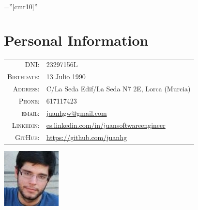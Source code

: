 \documentclass[a4paper,10pt]{article} %
\begin{document}
\pagestyle{empty} %

\font\fb=''[cmr10]'' %


\par{\bigskip\par} %

\section{Personal Information}

\noindent\begin{minipage}{0.3\textwidth}%
\begin{tabular}{rl}
\textsc{DNI:} & 23297156L \\
\textsc{Birthdate:} & 13 Julio 1990 \\
\textsc{Address:} & C/La Seda Edif/La Seda N7 2E, Lorca (Murcia) \\
\textsc{Phone:} & 617117423\\
\textsc{email:} & \href{mailto:juanhgw@gmail.com}{juanhgw@gmail.com} \\
\textsc{Linkedin:} & \url{es.linkedin.com/in/juansoftwareengineer} \\
\textsc{GitHub:} & \url{https://github.com/juanhg}
\end{tabular}
\end{minipage}%
\hfill%
\begin{minipage}{0.6\textwidth}\raggedleft
\includegraphics[width=30mm, height=30mm]{pictures/photo}
\end{minipage}

\end{document}
